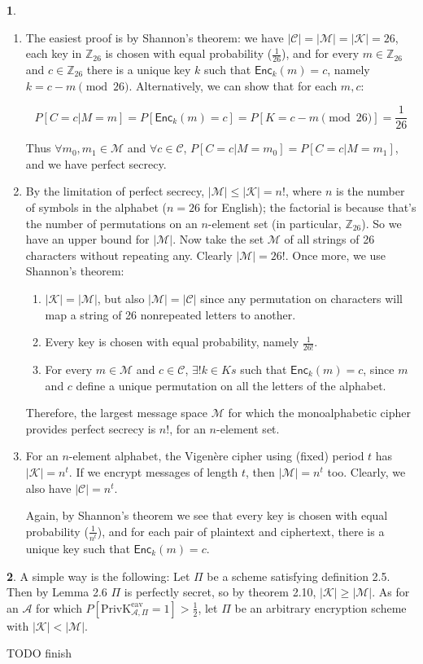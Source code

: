 \documentclass{article}
\theoremstyle{definition}
\newcommand{\bb}[1]{\mathbb{#1}}
\newcommand{\Z}{\bb{Z}}
\newcommand{\abs}[1]{\left|#1\right|}
\newcommand{\Enc}{\mathsf{Enc}}
\newcommand{\Ms}{\mathcal{M}} %
\newcommand{\Ks}{\mathcal{K}} %
\newcommand{\Cs}{\mathcal{C}} %
\newcommand{\Adv}{\mathcal{A}} %
\newcommand{\priveav}{\text{PrivK}_{\mathcal{A},\Pi}^\text{eav}}
\theoremstyle{definition}
\theoremstyle{definition}
\newtheorem{solution-internal}{}[subsection]
\newenvironment{solution}{
  \begin{solution-internal}
}{
  \end{solution-internal}
}
\begin{document}
\begin{solution}
  $ $
  \begin{enumerate}[label=\alph*.]
    \item The easiest proof is by Shannon's theorem: we have $\abs{\Cs} = \abs{\Ms} =
    \abs{\Ks} = 26$, each key in $\Z_{26}$ is chosen with equal probability
    ($\frac{1}{26}$), and for every $m \in \Z_{26}$ and $c \in \Z_{26}$ there is
    a unique key $k$ such that $\Enc_k(m) = c$, namely $k = c-m \pmod 26$.
    Alternatively, we can show that for each $m, c$:

    \[ P[C=c|M=m] = P[\Enc_k(m) = c] = P[K=c-m \pmod 26] = \frac{1}{26} \]

    Thus $\forall m_0, m_1 \in \Ms$ and $\forall c \in \Cs$, $P[C=c|M=m_0] =
    P[C=c|M=m_1]$, and we have perfect secrecy.
  \item By the limitation of perfect secrecy, $\abs{\Ms} \leq \abs{\Ks} = n!$,
    where $n$ is the number of symbols in the alphabet ($n = 26$ for English);
    the factorial is because that's the number of permutations on an $n$-element
    set (in particular, $\Z_{26}$). So we have an upper bound for $\abs{\Ms}$.
    Now take the set $\Ms$ of all strings of 26 characters without repeating
    any. Clearly $\abs{\Ms} = 26!$. Once more, we use Shannon's theorem:
    \begin{enumerate}[label=\arabic*.]
      \item $\abs{\Ks}  = \abs{\Ms}$, but also $\abs{\Ms} = \abs{\Cs}$ since any
        permutation on characters will map a string of 26 nonrepeated letters to another.
      \item Every key is chosen with equal probability, namely $\frac{1}{26!}$.
      \item For every $m \in \Ms$ and $c \in \Cs$, $\exists! k \in Ks$ such that
        $\Enc_k(m) = c$, since $m$ and $c$ define a unique permutation on all
        the letters of the alphabet.
    \end{enumerate}

    Therefore, the largest message space $\Ms$ for which the monoalphabetic
    cipher provides perfect secrecy is $n!$, for an $n$-element set.
  \item For an $n$-element alphabet, the Vigenère cipher using (fixed) period
    $t$ has $\abs{\Ks} = n^t$. If we encrypt messages of length $t$, then
    $\abs{\Ms} = n^t$ too. Clearly, we also have $\abs{\Cs} = n^t$.

    Again, by Shannon's theorem we see that every key is chosen with equal
    probability ($\frac{1}{n^t}$), and for each pair of plaintext and ciphertext,
    there is a unique key such that $\Enc_k(m) = c$.
  \end{enumerate}
\end{solution}
\begin{solution}
  A simple way is the following: Let $\Pi$ be a scheme satisfying definition
  2.5. Then by Lemma 2.6 $\Pi$ is perfectly secret, so by theorem 2.10,
  $\abs{\Ks} \geqslant \abs{\Ms}$. As for an $\Adv$ for which $P[\priveav = 1] >
  \frac{1}{2}$, let $\Pi$ be an arbitrary encryption scheme with $\abs{\Ks} <
  \abs{\Ms}$. 
  
  TODO finish
\end{solution}
\end{document}
